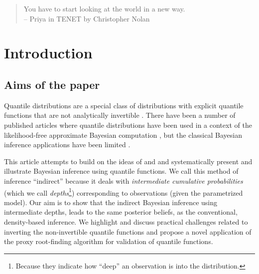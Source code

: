 \documentclass[ba]{imsart}
\numberwithin{equation}{section}
\theoremstyle{plain}
\begin{document}
\renewcommand{\[}{\begin{equation}}
\renewcommand{\]}{\end{equation}}

\begin {quote}
You have to start looking at the world in a new way.\\ 
-- Priya in TENET by Christopher Nolan 
\end{quote}

\hypertarget{introduction}{%
\section{Introduction}\label{introduction}}

\hypertarget{aims-of-the-paper}{%
\subsection{Aims of the paper}\label{aims-of-the-paper}}

Quantile distributions are a special class of distributions with explicit quantile functions that are not analytically invertible \citep{gilchrist2000StatisticalModellingQuantile}. There have been a number of published articles where quantile distributions have been used in a context of the likelihood-free approximate Bayesian computation \citep{allingham2009BayesianEstimationQuantile, drovandi2011LikelihoodfreeBayesianEstimation, karabatsos2018ApproximateLikelihoodPerspective, fearnhead2012ConstructingSummaryStatistics, bernton2019ApproximateBayesianComputation, mcvinish2012ImprovingABCQuantile}, but the classical Bayesian inference applications have been limited \citep{haynes2005BayesianEstimationGandk, rayner2002NumericalMaximumLikelihood}.

This article attempts to build on the ideas of \citet{rayner2002NumericalMaximumLikelihood} and \citet{nair2020BayesianInferenceQuantile} and systematically present and illustrate Bayesian inference using quantile functions. We call this method of inference ``indirect'' because it deals with \emph{intermediate cumulative probabilities} (which we call \emph{depths}\footnote{Because they indicate how ``deep'' an observation is into the distribution.}) corresponding to observations (given the parametrized model). Our aim is to show that the indirect Bayesian inference using intermediate depths, leads to the same posterior beliefs, as the conventional, density-based inference. We highlight and discuss practical challenges related to inverting the non-invertible quantile functions and propose a novel application of the proxy root-finding algorithm for validation of quantile functions.
\end{document}
